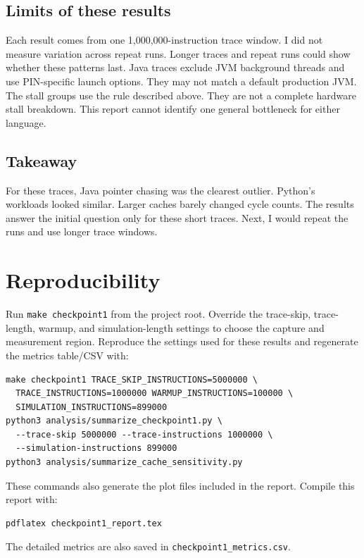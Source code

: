 \documentclass[11pt]{article}
\begin{document}
\subsection{Limits of these results}
Each result comes from one 1,000,000-instruction trace window. I did not
measure variation across repeat runs. Longer traces and repeat runs could show
whether these patterns last. Java traces exclude JVM background threads and
use PIN-specific launch options. They may not match a default production JVM.
The stall groups use the rule described above. They are not a complete
hardware stall breakdown. This report cannot identify one general bottleneck
for either language.

\subsection{Takeaway}
For these traces, Java pointer chasing was the clearest outlier. Python's
workloads looked similar. Larger caches barely changed cycle counts. The
results answer the initial question only for these short traces. Next, I
would repeat the runs and use longer trace windows.

\section{Reproducibility}
Run \texttt{make checkpoint1} from the project root. Override
the trace-skip, trace-length, warmup, and simulation-length settings to choose
the capture and measurement region. Reproduce the settings used for these
results and regenerate the metrics table/CSV with:
\begin{verbatim}
make checkpoint1 TRACE_SKIP_INSTRUCTIONS=5000000 \
  TRACE_INSTRUCTIONS=1000000 WARMUP_INSTRUCTIONS=100000 \
  SIMULATION_INSTRUCTIONS=899000
python3 analysis/summarize_checkpoint1.py \
  --trace-skip 5000000 --trace-instructions 1000000 \
  --simulation-instructions 899000
python3 analysis/summarize_cache_sensitivity.py
\end{verbatim}
These commands also generate the plot files included in the report.
Compile this report with:
\begin{verbatim}
pdflatex checkpoint1_report.tex
\end{verbatim}
The detailed metrics are also saved in \texttt{checkpoint1\_metrics.csv}.
\end{document}
